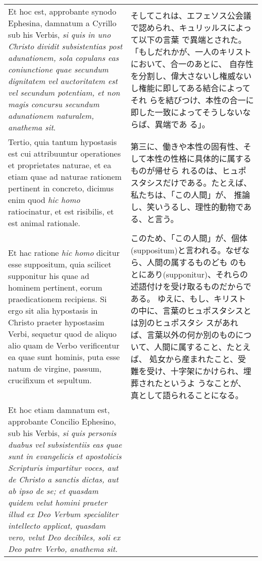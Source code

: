 \documentclass[10pt]{jsarticle} %
\begin{document}
\begin{longtable}{p{21em}p{21em}}
\\


Et hoc est, approbante synodo Ephesina, damnatum a
Cyrillo sub his Verbis, {\itshape si quis in uno Christo dividit subsistentias
post adunationem, sola copulans eas coniunctione quae secundum
dignitatem vel auctoritatem est vel secundum potentiam, et non magis
concursu secundum adunationem naturalem, anathema sit}. 


&

そしてこれは、エフェソス公会議で認められ、キュリッルスによって以下の言葉
 で異端とされた。「もしだれかが、一人のキリストにおいて、合一のあとに、
 自存性を分割し、偉大さないし権威ないし権能に即してある結合によってそれ
 らを結びつけ、本性の合一に即した一致によってそうしないならば、異端であ
 る」。


\\


Tertio, quia
tantum hypostasis est cui attribuuntur operationes et proprietates
naturae, et ea etiam quae ad naturae rationem pertinent in concreto,
dicimus enim quod {\itshape hic homo} ratiocinatur, et est risibilis, et est animal
rationale. 


&

第三に、働きや本性の固有性、そして本性の性格に具体的に属するものが帰せら
 れるのは、ヒュポスタシスだけである。たとえば、私たちは、「この人間」が、
 推論し、笑いうるし、理性的動物である、と言う。

\\


Et hac ratione {\itshape hic homo} dicitur esse suppositum, quia
scilicet supponitur his quae ad hominem pertinent, eorum praedicationem
recipiens. Si ergo sit alia hypostasis in Christo praeter hypostasim
Verbi, sequetur quod de aliquo alio quam de Verbo verificentur ea quae
sunt hominis, puta esse natum de virgine, passum, crucifixum et
sepultum. 


&

このため、「この人間」が、個体(suppositum)と言われる。なぜなら、人間の属するものども
 のもとにあり(supponitur)、それらの述語付けを受け取るものだからである。
 ゆえに、もし、キリストの中に、言葉のヒュポスタシスとは別のヒュポスタシ
 スがあれば、言葉以外の何か別のものについて、人間に属すること、たとえば、
 処女から産まれたこと、受難を受け、十字架にかけられ、埋葬されたというよ
 うなことが、真として語られることになる。

\\


Et hoc etiam damnatum est, approbante Concilio Ephesino, sub
his Verbis, {\itshape si quis personis duabus vel subsistentiis eas quae sunt in
evangelicis et apostolicis Scripturis impartitur voces, aut de Christo a
sanctis dictas, aut ab ipso de se; et quasdam quidem velut homini
praeter illud ex Deo Verbum specialiter intellecto applicat, quasdam
vero, velut Deo decibiles, soli ex Deo patre Verbo, anathema sit. }



\end{longtable}
\end{document}
